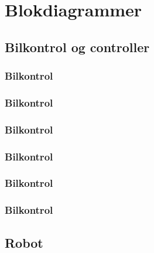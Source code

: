 \section{Blokdiagrammer}

\subsection{Bilkontrol og controller}

\subsubsection*{Bilkontrol}
\subsubsection*{Bilkontrol}
\subsubsection*{Bilkontrol}
\subsubsection*{Bilkontrol}
\subsubsection*{Bilkontrol}
\subsubsection*{Bilkontrol}



\subsection{Robot}